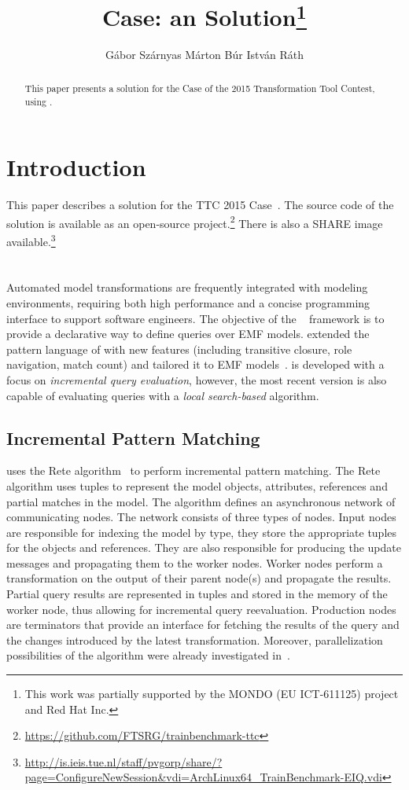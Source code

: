 \documentclass[submission,copyright,creativecommons]{eptcs}
\title{\tb Case: an \eiq Solution\thanks{This work was partially supported by the MONDO (EU ICT-611125) project and Red Hat Inc.}}
\author{G\'{a}bor Sz\'{a}rnyas \qquad M\'{a}rton B\'{u}r \qquad Istv\'{a}n R\'{a}th
\institute{Budapest University of Technology and Economics\\
Department of Measurement and Information Systems\\
H-1117 Magyar tud\'{o}sok krt. 2, Budapest, Hungary}
\email{szarnyas@mit.bme.hu, marton.bur@inf.mit.bme.hu, rath@mit.bme.hu}
}
\begin{document}
\maketitle

\begin{abstract}
This paper presents a solution for the \tb Case of the 2015 Transformation Tool Contest, using \eiq.
\end{abstract}

\section{Introduction}

This paper describes a solution for the TTC 2015 \tb Case~\cite{ttc-trainbenchmark-case}. The source code of the solution is available as an open-source project.\footnote{\url{https://github.com/FTSRG/trainbenchmark-ttc}} There is also a SHARE image available.\footnote{\url{http://is.ieis.tue.nl/staff/pvgorp/share/?page=ConfigureNewSession&vdi=ArchLinux64_TrainBenchmark-EIQ.vdi}}

\section{\eiq}

Automated model transformations are frequently integrated with modeling environments, requiring both high performance and a concise programming interface to support software engineers. The objective of the \eiq~\cite{models2010} framework is to provide a declarative way to define queries over EMF models. \eiq extended the pattern language of \viatratwo with new features (including transitive closure, role navigation, match count) and tailored it to EMF models~\cite{iqpl}. \eiq is developed with a focus on \emph{incremental query evaluation}, however, the most recent version is also capable of evaluating queries with a \emph{local search-based} algorithm.

\subsection{Incremental Pattern Matching}

\eiq uses the Rete algorithm~\cite{BergmannPhD} to perform incremental pattern matching. The Rete algorithm uses tuples to represent the model objects, attributes, references and partial matches in the model. The algorithm defines an asynchronous network of communicating nodes. The network consists of three types of nodes. Input nodes are responsible for indexing the model by type, \ie they store the appropriate tuples for the objects and references. They are also responsible for producing the update messages and propagating them to the worker nodes. Worker nodes perform a transformation on the output of their parent node(s) and propagate the results. Partial query results are represented in tuples and stored in the memory of the worker node, thus allowing for incremental query reevaluation. Production nodes are terminators that provide an interface for fetching the results of the query and the changes introduced by the latest transformation. Moreover, parallelization possibilities of the algorithm were already investigated in~\cite{Bergmann-gtvmt09}.
\end{document}
